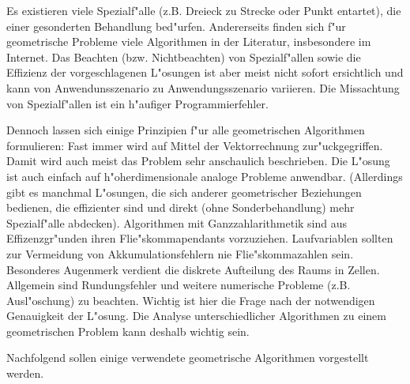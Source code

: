 Es existieren viele Spezialf"alle (z.B. Dreieck zu Strecke oder Punkt 
entartet), die einer gesonderten Behandlung bed"urfen. 
Andererseits finden sich f"ur geometrische Probleme viele Algorithmen 
in der Literatur, insbesondere im Internet. 
Das Beachten (bzw. Nichtbeachten) von Spezialf"allen sowie die Effizienz der 
vorgeschlagenen L"osungen ist aber meist nicht sofort ersichtlich und kann 
von Anwendunsszenario zu Anwendungsszenario variieren. Die Missachtung 
von Spezialf"allen ist ein h"aufiger Programmierfehler. 

Dennoch lassen sich einige Prinzipien f"ur alle geometrischen Algorithmen 
formulieren: Fast immer wird auf Mittel der Vektorrechnung zur"uckgegriffen. 
Damit wird auch meist das Problem sehr anschaulich beschrieben. Die L"osung 
ist auch einfach auf h"oherdimensionale analoge Probleme anwendbar. 
(Allerdings gibt es manchmal L"osungen, die sich anderer geometrischer 
Beziehungen bedienen, die effizienter sind und direkt (ohne Sonderbehandlung) 
mehr Spezialf"alle abdecken). Algorithmen mit Ganzzahlarithmetik sind aus 
Effizenzgr"unden ihren Flie"skommapendants vorzuziehen. Laufvariablen 
sollten zur Vermeidung von Akkumulationsfehlern nie Flie"skommazahlen sein. 
Besonderes Augenmerk verdient die diskrete Aufteilung des Raums in Zellen. 
Allgemein sind Rundungsfehler und weitere numerische Probleme 
(z.B. Ausl"oschung) zu beachten. 
Wichtig ist hier die Frage nach der notwendigen Genauigkeit der L"osung. 
Die Analyse unterschiedlicher Algorithmen zu einem geometrischen Problem 
kann deshalb wichtig sein.

Nachfolgend sollen einige verwendete geometrische Algorithmen vorgestellt 
werden.










